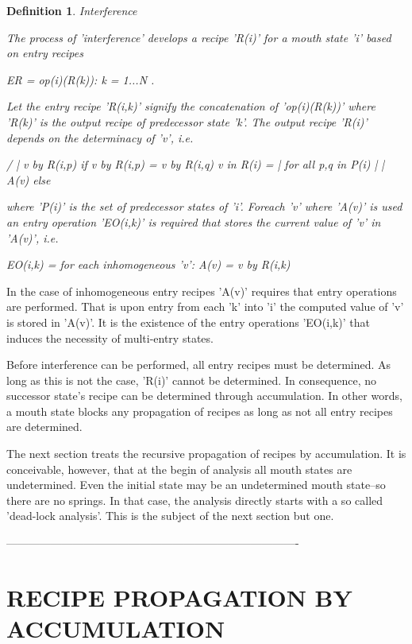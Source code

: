 \documentclass[12pt]{article}
\newtheorem{definition}{Definition}
\begin{document}
\begin{definition}
Interference

The process of 'interference' develops a recipe 'R(i)' for a mouth state
'i' based on entry recipes 

              ER = { op(i)(R(k)): k = 1...N }. 
              
Let the entry recipe 'R(i,k)' signify the concatenation of 'op(i)(R(k))'
where 'R(k)' is the output recipe of predecessor state 'k'. The output
recipe 'R(i)' depends on the determinacy of 'v', i.e. 

                 /
                 |  v by R(i,p)   if v by R(i,p) = v by R(i,q) 
     v in R(i) = |                for all p,q in P(i)
                 |
                 |  A(v)          else
                 \

where 'P(i)' is the set of predecessor states of 'i'. Foreach 'v' where
'A(v)' is used an entry operation 'EO(i,k)' is required that stores
the current value of 'v' in 'A(v)', i.e.

     EO(i,k) = { for each inhomogeneous 'v': A(v) = v by R(i,k) }
\end{definition}

In the case of inhomogeneous entry recipes 'A(v)' requires that entry
operations are performed.  That is upon entry from each 'k' into 'i' the
computed value of 'v' is stored in 'A(v)'.  It is the existence of the entry
operations 'EO(i,k)' that induces the necessity of multi-entry states.  

Before interference can be performed, all entry recipes must be determined.  As
long as this is not the case, 'R(i)' cannot be determined. In consequence, no
successor state's recipe can be determined through accumulation. In other
words,  a mouth state blocks any propagation of recipes as long as not all
entry recipes are determined. 

The next section treats the recursive propagation of recipes by accumulation.
It is conceivable, however, that at the begin of analysis all mouth states are
undetermined. Even the initial state may be an undetermined mouth state--so
there are no springs. In that case, the analysis directly starts with a so
called 'dead-lock analysis'. This is the subject of the next section but one.

-------------------------------------------------------------------------------

\section{RECIPE PROPAGATION BY ACCUMULATION}
\end{document}
